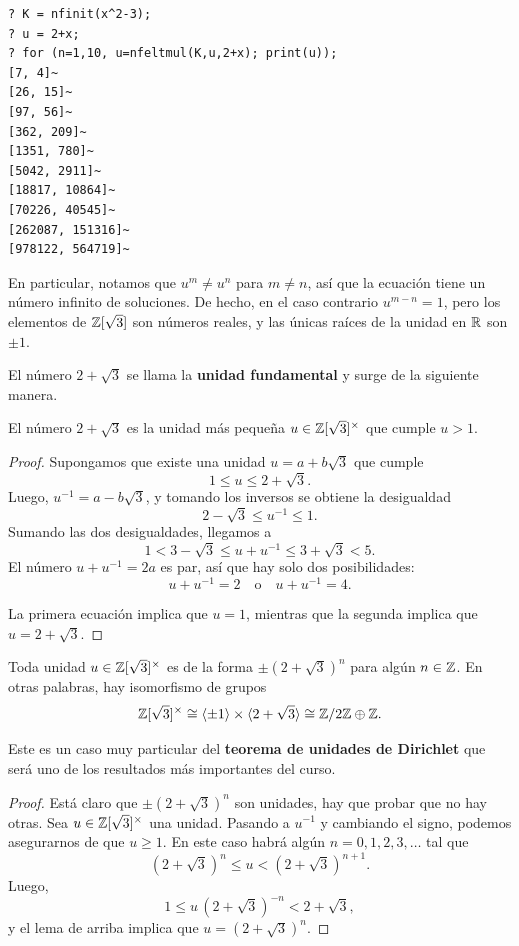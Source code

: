 \begin{shaded}
\begin{verbatim}
? K = nfinit(x^2-3);
? u = 2+x;
? for (n=1,10, u=nfeltmul(K,u,2+x); print(u));
[7, 4]~
[26, 15]~
[97, 56]~
[362, 209]~
[1351, 780]~
[5042, 2911]~
[18817, 10864]~
[70226, 40545]~
[262087, 151316]~
[978122, 564719]~
\end{verbatim}
\end{shaded}

En particular, notamos que $u^m \ne u^n$ para $m \ne n$, así que la ecuación
tiene un número infinito de soluciones. De hecho, en el caso contrario
$u^{m-n} = 1$, pero los elementos de $\mathbb{Z} [\sqrt{3}]$ son números reales,
y las únicas raíces de la unidad en $\mathbb{R}$ son $\pm 1$.

El número $2 + \sqrt{3}$ se llama la \textbf{unidad fundamental} y surge de la
siguiente manera.

\begin{lema}
  \label{lema:unidad-fundamental-3}
  El número $2 + \sqrt{3}$ es la unidad más pequeña
  $u \in \mathbb{Z} [\sqrt{3}]^\times$ que cumple $u > 1$.

  \begin{proof}
    Supongamos que existe una unidad $u = a + b\sqrt{3}$ que cumple
    $$1 \le u \le 2 + \sqrt{3}.$$
    Luego, $u^{-1} = a - b\sqrt{3}$, y tomando los inversos se obtiene la
    desigualdad
    $$2 - \sqrt{3} \le u^{-1} \le 1.$$
    Sumando las dos desigualdades, llegamos a
    $$1 < 3 - \sqrt{3} \le u + u^{-1} \le 3 + \sqrt{3} < 5.$$
    El número $u + u^{-1} = 2a$ es par, así que hay solo dos posibilidades:
    $$u + u^{-1} = 2 \quad\text{o}\quad u + u^{-1} = 4.$$

    La primera ecuación implica que $u = 1$, mientras que la segunda implica que
    $u = 2 + \sqrt{3}$.
\end{proof}
\end{lema}

\begin{teorema}
  Toda unidad $u \in \mathbb{Z} [\sqrt{3}]^\times$ es de la forma $\pm (2 +
  \sqrt{3})^n$ para algún $n \in \mathbb{Z}$. En otras palabras, hay isomorfismo de
  grupos
  \[ \mathbb{Z} [\sqrt{3}]^\times
       \cong \langle \pm 1\rangle \times \langle 2 + \sqrt{3}\rangle
       \cong \mathbb{Z}/2\mathbb{Z} \oplus \mathbb{Z}. \]
\end{teorema}

Este es un caso muy particular del \textbf{teorema de unidades de Dirichlet} que
será uno de los resultados más importantes del curso.

\begin{proof}
  Está claro que $\pm (2 + \sqrt{3})^n$ son unidades, hay que probar que no hay
  otras. Sea $u \in \mathbb{Z} [\sqrt{3}]^\times$ una unidad. Pasando a $u^{-1}$ y
  cambiando el signo, podemos asegurarnos de que $u \ge 1$. En este caso habrá
  algún $n = 0,1,2,3,\ldots$ tal que
  $$(2 + \sqrt{3})^n \le u < (2 + \sqrt{3})^{n+1}.$$
  Luego,
  $$1 \le u\,(2 + \sqrt{3})^{-n} < 2 + \sqrt{3},$$
  y el lema de arriba implica que $u = (2 + \sqrt{3})^n$.
\end{proof}

